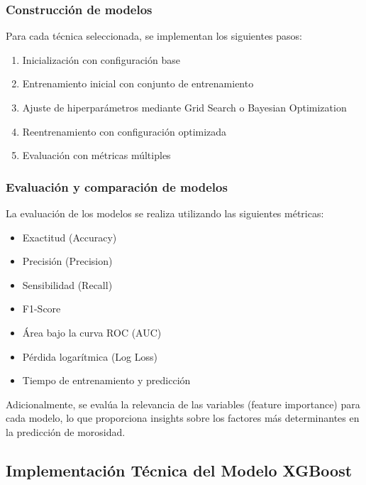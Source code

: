 \subsubsection{Construcción de modelos}
Para cada técnica seleccionada, se implementan los siguientes pasos:

\begin{enumerate}
    \item Inicialización con configuración base
    \item Entrenamiento inicial con conjunto de entrenamiento
    \item Ajuste de hiperparámetros mediante Grid Search o Bayesian Optimization
    \item Reentrenamiento con configuración optimizada
    \item Evaluación con métricas múltiples
\end{enumerate}

\subsubsection{Evaluación y comparación de modelos}
La evaluación de los modelos se realiza utilizando las siguientes métricas:

\begin{itemize}
    \item Exactitud (Accuracy)
    \item Precisión (Precision)
    \item Sensibilidad (Recall)
    \item F1-Score
    \item Área bajo la curva ROC (AUC)
    \item Pérdida logarítmica (Log Loss)
    \item Tiempo de entrenamiento y predicción
\end{itemize}

Adicionalmente, se evalúa la relevancia de las variables (feature importance) para cada modelo, lo que proporciona insights sobre los factores más determinantes en la predicción de morosidad.

\subsection{Implementación Técnica del Modelo XGBoost}

